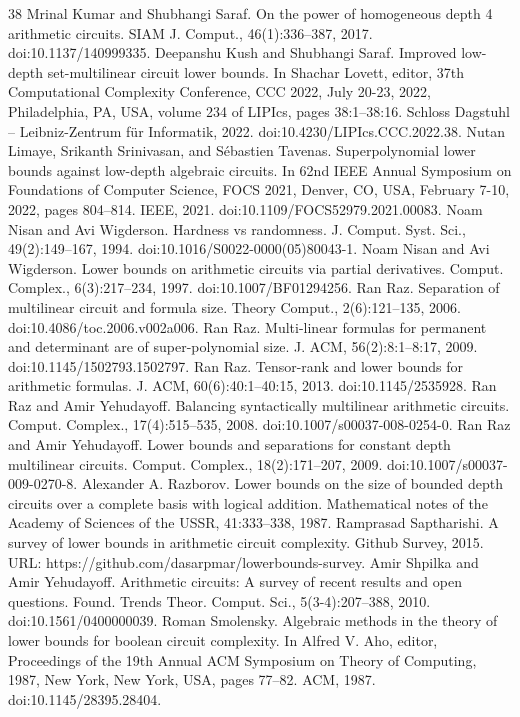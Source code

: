 \documentclass[10pt,a4paper]{article}
\begin{document}
\begin{thebibliography}{38}
 Mrinal Kumar and Shubhangi Saraf. On the power of homogeneous depth 4 arithmetic circuits. SIAM J. Comput., 46(1):336–387, 2017. doi:10.1137/140999335.
 Deepanshu Kush and Shubhangi Saraf. Improved low-depth set-multilinear circuit lower bounds. In Shachar Lovett, editor, 37th Computational Complexity Conference, CCC 2022, July 20-23, 2022, Philadelphia, PA, USA, volume 234 of LIPIcs, pages 38:1–38:16. Schloss Dagstuhl – Leibniz-Zentrum für Informatik, 2022. doi:10.4230/LIPIcs.CCC.2022.38.
 Nutan Limaye, Srikanth Srinivasan, and Sébastien Tavenas. Superpolynomial lower bounds against low-depth algebraic circuits. In 62nd IEEE Annual Symposium on Foundations of Computer Science, FOCS 2021, Denver, CO, USA, February 7-10, 2022, pages 804–814. IEEE, 2021. doi:10.1109/FOCS52979.2021.00083.
 Noam Nisan and Avi Wigderson. Hardness vs randomness. J. Comput. Syst. Sci., 49(2):149–167, 1994. doi:10.1016/S0022-0000(05)80043-1.
 Noam Nisan and Avi Wigderson. Lower bounds on arithmetic circuits via partial derivatives. Comput. Complex., 6(3):217–234, 1997. doi:10.1007/BF01294256.
 Ran Raz. Separation of multilinear circuit and formula size. Theory Comput., 2(6):121–135, 2006. doi:10.4086/toc.2006.v002a006.
 Ran Raz. Multi-linear formulas for permanent and determinant are of super-polynomial size. J. ACM, 56(2):8:1–8:17, 2009. doi:10.1145/1502793.1502797.
 Ran Raz. Tensor-rank and lower bounds for arithmetic formulas. J. ACM, 60(6):40:1–40:15, 2013. doi:10.1145/2535928.
 Ran Raz and Amir Yehudayoff. Balancing syntactically multilinear arithmetic circuits. Comput. Complex., 17(4):515–535, 2008. doi:10.1007/s00037-008-0254-0.
 Ran Raz and Amir Yehudayoff. Lower bounds and separations for constant depth multilinear circuits. Comput. Complex., 18(2):171–207, 2009. doi:10.1007/s00037-009-0270-8.
 Alexander A. Razborov. Lower bounds on the size of bounded depth circuits over a complete basis with logical addition. Mathematical notes of the Academy of Sciences of the USSR, 41:333–338, 1987.
 Ramprasad Saptharishi. A survey of lower bounds in arithmetic circuit complexity. Github Survey, 2015. URL: https://github.com/dasarpmar/lowerbounds-survey.
 Amir Shpilka and Amir Yehudayoff. Arithmetic circuits: A survey of recent results and open questions. Found. Trends Theor. Comput. Sci., 5(3-4):207–388, 2010. doi:10.1561/0400000039.
 Roman Smolensky. Algebraic methods in the theory of lower bounds for boolean circuit complexity. In Alfred V. Aho, editor, Proceedings of the 19th Annual ACM Symposium on Theory of Computing, 1987, New York, New York, USA, pages 77–82. ACM, 1987. doi:10.1145/28395.28404.

\end{thebibliography}
\end{document}
